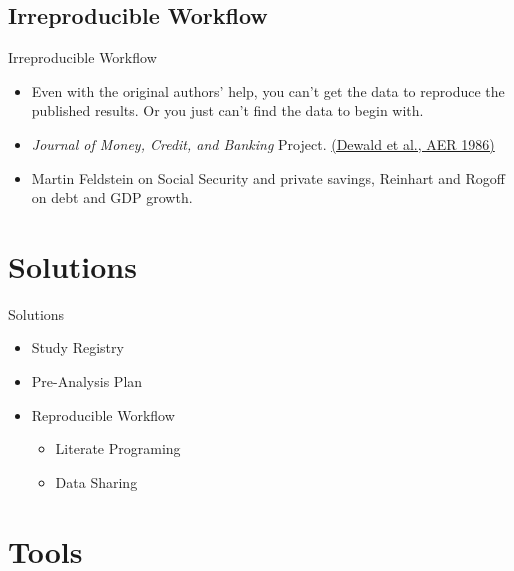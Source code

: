 \documentclass{beamer}
\begin{document}
\subsection{Irreproducible Workflow}
 \begin{frame}{Irreproducible Workflow}
 \begin{itemize}
 \item
  Even with the original authors' help, you can't get the data to reproduce the published results. Or you just can't find the data to begin with. 
  \item \textit{Journal of Money, Credit, and Banking} Project. \href{http://www.jstor.org/stable/1806061}{(Dewald et al., AER 1986)}
   \item Martin Feldstein on Social Security and private savings, Reinhart and Rogoff on debt and GDP growth.
 \end{itemize} 
 \end{frame}

\section{Solutions}
\begin{frame}{Solutions}
\begin{itemize}[<+->]
\item Study Registry
\item Pre-Analysis Plan
\item Reproducible Workflow
 \begin{itemize}
 \item Literate Programing 
 \item Data Sharing
 \end{itemize}
\end{itemize}
\end{frame}

\section{Tools}
\end{document}

